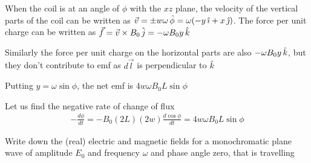 \documentclass[../main.tex]{subfiles}
\begin{document}
\begin{questions}
\begin{solution}
	When the coil is at an angle of $\phi$ with the $xz$ plane, the velocity of the vertical parts of the coil can be written as $\vec{v}=\pm w\omega\,\hat{\phi}=\omega(-y\,\hat{\imath}+x\,\hat{\jmath})$. The force per unit charge can be written as $\vec{f}=\vec{v}\times B_0\,\hat{j}=-\omega B_0 y\,\hat{k}$

	Similarly the force per unit charge on the horizontal parts are also $-\omega B_0 y\,\hat{k}$, but they don't contribute to emf as $d\vec{l}$ is perpendicular to $\hat{k}$

	Putting $y=\omega\sin\phi$, the net emf is $4w\omega B_0L\sin\phi$

	Let us find the negative rate of change of flux
	\begin{gather}
		-\frac{d\phi}{dt} = -B_0(2L)(2w)\frac{d\cos\phi}{dt} = 4w\omega B_0L\sin\phi
	\end{gather}
\end{solution}

\question Write down the (real) electric and magnetic fields for a monochromatic plane wave of amplitude $E_0$
and frequency $\omega$ and phase angle zero, that is travelling
\end{questions}
\end{document}
